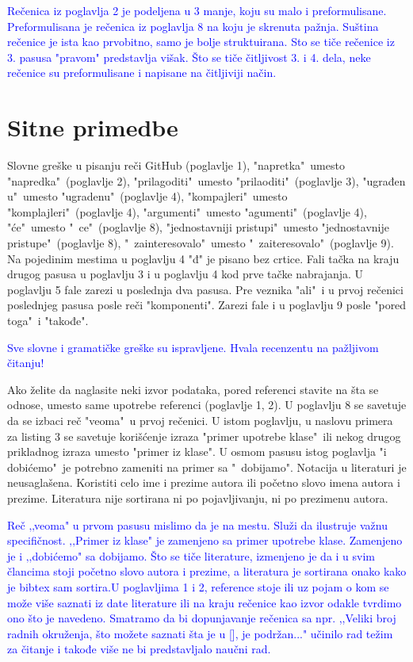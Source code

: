 \documentclass[a4paper]{report}
\newcommand{\odgovor}[1]{\textcolor{blue}{#1}}
\begin{document}
\odgovor{Rečenica iz poglavlja 2 je podeljena u 3 manje, koju su malo i preformulisane. Preformulisana je rečenica iz poglavlja 8 na koju je skrenuta pažnja. Suština rečenice je ista kao prvobitno, samo je bolje struktuirana. Sto se tiče rečenice iz 3. pasusa "pravom" predstavlja višak. Što se tiče čitljivost 3. i 4. dela, neke rečenice su preformulisane i napisane na čitljiviji način.}

\section{Sitne primedbe}
Slovne greške u pisanju reči GitHub (poglavlje 1), "napretka"\ umesto "napredka"\ (poglavlje 2), "prilagoditi"\ umesto "prilaoditi"\ (poglavlje 3), "ugrađen u"\ umesto "ugradenu"\ (poglavlje 4), "kompajleri"\ umesto "komplajleri"\ (poglavlje 4), "argumenti"\ umesto "agumenti"\ (poglavlje 4), "će"\ umesto "\ ce"\ (poglavlje 8), "jednostavniji pristupi"\ umesto "jednostavnije pristupe"\ (poglavlje 8), "\ zainteresovalo"\ umesto "\ zaiteresovalo"\ (poglavlje 9). Na pojedinim mestima u poglavlju 4 "đ" je pisano bez crtice. Fali tačka na kraju drugog pasusa u poglavlju 3 i u poglavlju 4 kod prve tačke nabrajanja. U poglavlju 5 fale zarezi u poslednja dva pasusa. Pre veznika "ali"\ i u prvoj rečenici poslednjeg pasusa posle reči "komponenti". Zarezi fale i u poglavlju 9 posle "pored toga"\ i "takođe".

\odgovor{Sve slovne i gramatičke greške su ispravljene. Hvala recenzentu na pažljivom čitanju!}

Ako želite da naglasite neki izvor podataka, pored referenci stavite na šta se odnose, umesto same upotrebe referenci (poglavlje 1, 2). U poglavlju 8 se savetuje da se izbaci reč "veoma"\ u prvoj rečenici. U istom poglavlju, u naslovu primera za listing 3 se savetuje korišćenje izraza "primer upotrebe klase"\ ili nekog drugog prikladnog izraza umesto "primer iz klase". U osmom pasusu istog poglavlja "i dobićemo"\ je potrebno zameniti na primer sa "\ dobijamo".
Notacija u literaturi je neusaglašena. Koristiti celo ime i prezime autora ili početno slovo imena autora i prezime. Literatura nije sortirana ni po pojavljivanju, ni po prezimenu autora.

\odgovor{Reč ‚‚veoma" u prvom pasusu mislimo da je na mestu. Služi da ilustruje važnu specifičnost. ‚‚Primer iz klase" je zamenjeno sa
primer upotrebe klase. Zamenjeno je i ‚‚dobićemo" sa dobijamo.
Što se tiče literature, izmenjeno je da i u svim člancima stoji početno slovo autora i prezime, a literatura je sortirana onako kako je bibtex sam sortira.U poglavljima 1 i 2, reference stoje ili uz pojam o kom se može više saznati iz date literature ili na kraju rečenice kao izvor odakle tvrdimo ono što je navedeno. Smatramo da bi dopunjavanje rečenica sa npr. ,,Veliki broj radnih okruženja, što možete saznati šta je u [], je podržan..." učinilo rad težim za čitanje i takođe više ne bi predstavljalo naučni rad.}
\end{document}
